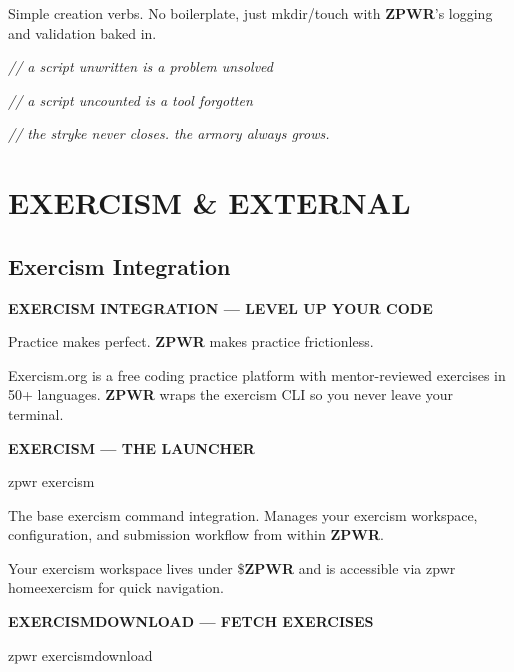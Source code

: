 \documentclass[11pt,a4paper,twoside]{book}
\begin{document}
Simple creation verbs. No boilerplate, just mkdir/touch with \textbf{ZPWR}'s logging and validation baked in.

{\small\itshape\color{dimtext} // a script unwritten is a problem unsolved}

{\small\itshape\color{dimtext} // a script uncounted is a tool forgotten}

{\small\itshape\color{dimtext} // the stryke never closes. the armory always grows.}


\vspace{16pt}


\chapter{EXERCISM \& EXTERNAL}

\section{Exercism Integration}


\vspace{10pt}
{\large\bfseries\color{neoncyan} EXERCISM INTEGRATION — LEVEL UP YOUR CODE}\vspace{6pt}

Practice makes perfect. \textbf{ZPWR} makes practice frictionless.

Exercism.org is a free coding practice platform with mentor-reviewed exercises in 50+ languages. \textbf{ZPWR} wraps the exercism CLI so you never leave your terminal.


\vspace{12pt}
{\bfseries\color{neonyellow} EXERCISM — THE LAUNCHER}\vspace{4pt}

\begin{codebox}
\color{neongreen}zpwr exercism\\
\end{codebox}

The base exercism command integration. Manages your exercism workspace, configuration, and submission workflow from within \textbf{ZPWR}.

Your exercism workspace lives under \$\textbf{ZPWR} and is accessible via zpwr homeexercism for quick navigation.


\vspace{12pt}
{\bfseries\color{neonyellow} EXERCISMDOWNLOAD — FETCH EXERCISES}\vspace{4pt}

\begin{codebox}
\color{neongreen}zpwr exercismdownload\\
\end{codebox}
\end{document}

